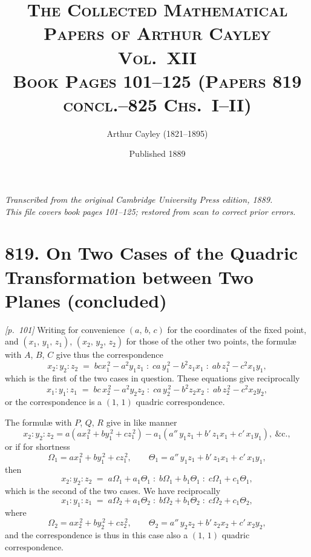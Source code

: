 \documentclass[11pt,a4paper]{article}
\theoremstyle{plain}
\theoremstyle{definition}
\theoremstyle{remark}
\begin{document}
\title{\scshape The Collected Mathematical Papers of Arthur Cayley\\Vol.\ XII\\[0.5em]\large Book Pages 101--125 (Papers 819 concl.--825 Chs.\ I--II)}
\author{Arthur Cayley (1821--1895)}
\date{Published 1889}
\maketitle

\thispagestyle{empty}
\begin{center}
\textit{Transcribed from the original Cambridge University Press edition, 1889.}\\
\textit{This file covers book pages 101--125; restored from scan to correct prior errors.}
\end{center}

\tableofcontents
\newpage

\section*{819. On Two Cases of the Quadric Transformation between Two Planes (concluded)}

\noindent\textit{[p.~101]} Writing for convenience $(a,\,b,\,c)$ for the coordinates of the fixed point, and $(x_1,\,y_1,\,z_1)$, $(x_2,\,y_2,\,z_2)$ for those of the other two points, the formul\ae{} with $A$, $B$, $C$ give thus the correspondence
\[
x_2 : y_2 : z_2 \;=\; bcx_1^{\,2} - a^2 y_1 z_1 \;:\; ca\,y_1^{\,2} - b^2 z_1 x_1 \;:\; ab\,z_1^{\,2} - c^2 x_1 y_1,
\]
which is the first of the two cases in question. These equations give reciprocally
\[
x_1 : y_1 : z_1 \;=\; bc\,x_2^{\,2} - a^2 y_2 z_2 \;:\; ca\,y_2^{\,2} - b^2 z_2 x_2 \;:\; ab\,z_2^{\,2} - c^2 x_2 y_2,
\]
or the correspondence is a $(1,\,1)$ quadric correspondence.

The formul\ae{} with $P$, $Q$, $R$ give in like manner
\[
x_2 : y_2 : z_2 = a(a x_1^{\,2} + b y_1^{\,2} + c z_1^{\,2}) - a_1(a''\,y_1 z_1 + b'\,z_1 x_1 + c'\,x_1 y_1),\ \&\text{c.},
\]
or if for shortness
\[
\Omega_1 = a x_1^{\,2} + b y_1^{\,2} + c z_1^{\,2},\qquad
\Theta_1 = a''\,y_1 z_1 + b'\,z_1 x_1 + c'\,x_1 y_1,
\]
then
\[
x_2 : y_2 : z_2 \;=\; a\Omega_1 + a_1\Theta_1 \;:\; b\Omega_1 + b_1\Theta_1 \;:\; c\Omega_1 + c_1\Theta_1,
\]
which is the second of the two cases. We have reciprocally
\[
x_1 : y_1 : z_1 \;=\; a\Omega_2 + a_1\Theta_2 \;:\; b\Omega_2 + b_1\Theta_2 \;:\; c\Omega_2 + c_1\Theta_2,
\]
where
\[
\Omega_2 = a x_2^{\,2} + b y_2^{\,2} + c z_2^{\,2},\qquad
\Theta_2 = a''\,y_2 z_2 + b'\,z_2 x_2 + c'\,x_2 y_2,
\]
and the correspondence is thus in this case also a $(1,\,1)$ quadric correspondence.
\end{document}
